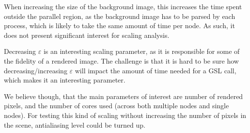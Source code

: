When increasing the size of the background image, this increases the time spent outside the parallel region, as the background image has to be parsed by each process, which is likely to take the same amount of time per node. As such, it does not present significant interest for scaling analysis.

Decreasing $\varepsilon$ is an interesting scaling parameter, as it is responsible for some of the fidelity of a rendered image. The challenge is that it is hard to be sure how decreasing/increasing $\varepsilon$ will impact the amount of time needed for a GSL call, which makes it an interesting parameter.

We believe though, that the main parameters of interest are number of rendered pixels, and the number of cores used (across both multiple nodes and single nodes). For testing this kind of scaling without increasing the number of pixels in the scene, antialiasing level could be turned up.

